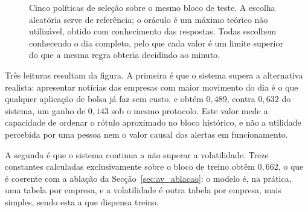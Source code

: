 \begin{figure}[ht]
\centering
{}
\caption[O sistema contra as alternativas já disponíveis]{Cinco políticas de seleção sobre o mesmo
bloco de teste. A escolha aleatória serve de referência; o oráculo é um máximo teórico não utilizável,
obtido com conhecimento das respostas. Todas escolhem conhecendo o dia
completo, pelo que cada valor é um limite superior do que a mesma regra obteria decidindo ao minuto.}
\label{fig:av_pontaaponta}
\end{figure}

Três leituras resultam da figura. A primeira é que o sistema supera a alternativa realista: apresentar
notícias das empresas com maior movimento do dia é o que qualquer aplicação de bolsa já faz sem
custo, e obtém $0{,}489$, contra $0{,}632$ do sistema, um ganho de $0{,}143$ sob o mesmo protocolo.
Este valor mede a capacidade de ordenar o rótulo aproximado no bloco histórico, e não a utilidade
percebida por uma pessoa nem o valor causal dos alertas em funcionamento.

A segunda é que o sistema continua a não superar a volatilidade. Treze constantes calculadas
exclusivamente sobre o bloco de treino obtêm $0{,}662$, o que é coerente com a ablação da
Secção~\ref{sec:av_ablacao}: o modelo é, na prática, uma tabela por empresa, e a volatilidade é outra
tabela por empresa, mais simples, sendo esta a que dispensa treino.

